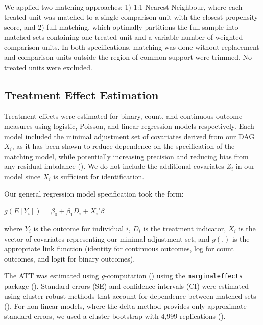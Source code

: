 \documentclass[
  jou,
  floatsintext,
  longtable,
  nolmodern,
  notxfonts,
  notimes,
  colorlinks=true,linkcolor=blue,citecolor=blue,urlcolor=blue]{apa7}
\begin{document}
We applied two matching approaches: 1) 1:1 Nearest Neighbour, where each
treated unit was matched to a single comparison unit with the closest
propensity score, and 2) full matching, which optimally partitions the
full sample into matched sets containing one treated unit and a variable
number of weighted comparison units. In both specifications, matching
was done without replacement and comparison units outside the region of
common support were trimmed. No treated units were excluded.

\subsection{Treatment Effect
Estimation}\label{treatment-effect-estimation}

Treatment effects were estimated for binary, count, and continuous
outcome measures using logistic, Poisson, and linear regression models
respectively. Each model included the minimal adjustment set of
covariates derived from our DAG \(X_i\), as it has been shown to reduce
dependence on the specification of the matching model, while potentially
increasing precision and reducing bias from any residual imbalance
(). We do not include the additional covariates \(Z_i\)
in our model since \(X_i\) is sufficient for identification.

Our general regression model specification took the form:

\begin{center}
$g(E[Y_i]) = \beta_0 + \beta_1 D_i + X_i'\beta$
\end{center}

where \(Y_i\) is the outcome for individual \(i\), \(D_i\) is the
treatment indicator, \(X_i\) is the vector of covariates representing
our minimal adjustment set, and \(g(.)\) is the appropriate link
function (identity for continuous outcomes, log for count outcomes, and
logit for binary outcomes).

The ATT was estimated using \emph{g}-computation
() using the \texttt{marginaleffects} package
(). Standard errors (SE) and confidence intervals
(CI) were estimated using cluster-robust methods that account for
dependence between matched sets
(). For non-linear models, where the delta method provides only
approximate standard errors, we used a cluster bootstrap with 4,999
replications ().
\end{document}
